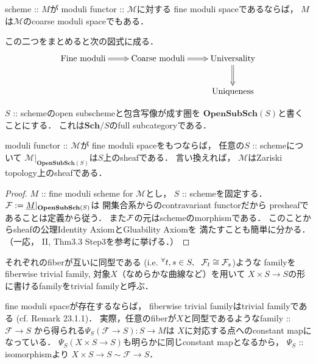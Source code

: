 \documentclass[a4paper]{jsarticle}
\newcommand{\Sch}{\mathbf{Sch}}
\newcommand{\OpenSubSch}{\mathbf{OpenSubSch}}
\newcommand{\famF}{\mathcal{F}}
\newcommand{\ftor}[1]{\underline{#1}}
\newcommand{\ftorM}{\mathcal{M}}
\begin{document}
    \begin{Prop}
        scheme :: $M$が
        moduli functor :: $\ftorM$に対する
        fine moduli spaceであるならば，
        $M$は$\ftorM$のcoarse moduli spaceでもある．
    \end{Prop}
    この二つをまとめると次の図式に成る．
    \[\xymatrix{
        \text{Fine moduli} \ar@{=>}[r]& \text{Coarse moduli} \ar@{=>}[r]& \text{Universality} \ar@{=>}[d]\\
        {} & {} & \text{Uniqueness}
    }\]
    
    \begin{Prop}
        $S$ :: schemeのopen subschemeと包含写像が成す圏を
        $\OpenSubSch(S)$と書くことにする．
        これは$\Sch/S$のfull subcategoryである．

        moduli functor :: $\ftorM$が
        fine moduli spaceをもつならば，
        任意の$S$ :: schemeについて
        $\ftorM|_{\OpenSubSch(S)}$は$S$上のsheafである．
        言い換えれば，
        $\ftorM$はZariski topology上のsheafである．
    \end{Prop}
    \begin{proof}
        $M$ :: fine moduli scheme for $\ftorM$とし，
        $S$ :: schemeを固定する．
        $\shF:=\ftor{M}|_{\OpenSubSch(S)}$は
        開集合系からのcontravariant functorだから
        presheafであることは定義から従う．
        また$\mathcal{F}$の元はschemeのmorphismである．
        このことからsheafの公理Identity AxiomとGluability Axiomを
        満たすことも簡単に分かる．
        （一応，\cite{HarAG} II, Thm3.3 Step3を参考に挙げる．）
    \end{proof}

    \begin{Remark}\label{remark:trivfamily}
        それぞれのfiberが互いに同型である
        (i.e. $\Forall{t,s \in S} \famF_t \iso \famF_s$)ような
        familyをfiberwise trivial family, 
        対象$X$（なめらかな曲線など）を用いて
        $X \times S \to S$の形に書けるfamilyをtrivial familyと呼ぶ．

        fine moduli spaceが存在するならば，
        fiberwise trivial familyはtrivial familyである
        (cf. \cite{HarDef} Remark 23.1.1)．
        実際，任意のfiberが$X$と同型であるようなfamily :: $\famF \to S$
        から得られる$\Psi_S(\famF \to S): S \to M$は
        $X$に対応する点へのconstant mapになっている．
        $\Psi_S(X \times S \to S)$も明らかに同じconstant mapとなるから，
        $\Psi_S$ :: isomorphismより
        $X \times S \to S \sim \famF \to S$．
    \end{Remark}
\end{document}
